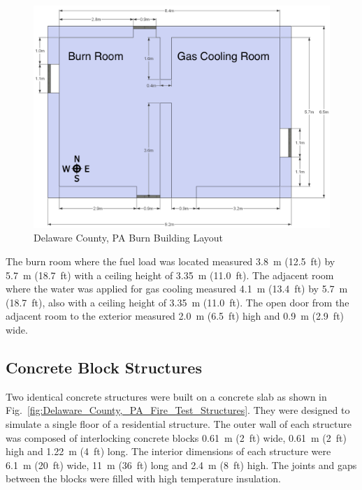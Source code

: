 \documentclass[12pt,oneside]{book}
\begin{document}
\begin{figure}[!ht]
	\includegraphics[width=6in]{../Figures/Pictures/DelCoBurnBuildingDimensions}
	\caption{Delaware County, PA Burn Building Layout}
	\label{fig:Delaware_County,_PA_Burn_Building_Layout}
\end{figure}

The burn room where the fuel load was located measured 3.8~m (12.5~ft) by 5.7~m (18.7~ft) with a ceiling height of 3.35~m (11.0~ft). The adjacent room where the water was applied for gas cooling measured 4.1~m (13.4~ft) by 5.7~m (18.7~ft), also with a ceiling height of 3.35~m (11.0~ft). The open door from the adjacent room to the exterior measured 2.0~m (6.5~ft) high and 0.9~m (2.9~ft) wide.

\subsection{Concrete Block Structures}
\label{sec:Experimental Structures}

Two identical concrete structures were built on a concrete slab as shown in Fig.~\ref{fig:Delaware_County,_PA_Fire_Test_Structures}. They were designed to simulate a single floor of a residential structure.  The outer wall of each structure was composed of interlocking concrete blocks 0.61~m (2~ft) wide, 0.61~m (2~ft) high and 1.22~m (4~ft) long.  The interior dimensions of each structure were 6.1~m (20~ft) wide, 11~m (36~ft) long and 2.4~m (8~ft) high. The joints and gaps between the blocks were filled with high temperature insulation.
\end{document}
